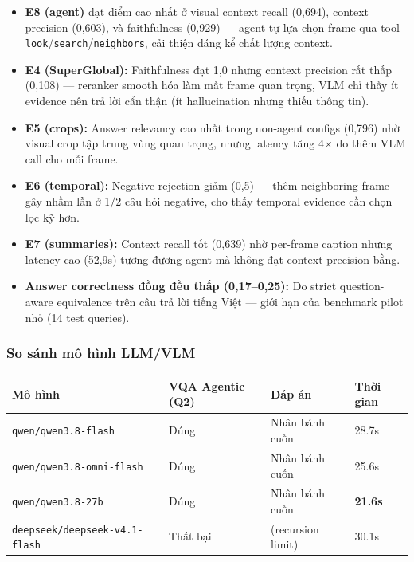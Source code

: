 \documentclass[12pt,a4paper,onecolumn]{article}
\begin{document}
\begin{itemize}
  \item \textbf{E8 (agent)} đạt điểm cao nhất ở visual context recall (0,694), context precision (0,603), và faithfulness (0,929) — agent tự lựa chọn frame qua tool \texttt{look}/\texttt{search}/\texttt{neighbors}, cải thiện đáng kể chất lượng context.
  \item \textbf{E4 (SuperGlobal):} Faithfulness đạt 1,0 nhưng context precision rất thấp (0,108) — reranker smooth hóa làm mất frame quan trọng, VLM chỉ thấy ít evidence nên trả lời cẩn thận (ít hallucination nhưng thiếu thông tin).
  \item \textbf{E5 (crops):} Answer relevancy cao nhất trong non-agent configs (0,796) nhờ visual crop tập trung vùng quan trọng, nhưng latency tăng 4× do thêm VLM call cho mỗi frame.
  \item \textbf{E6 (temporal):} Negative rejection giảm (0,5) — thêm neighboring frame gây nhầm lẫn ở 1/2 câu hỏi negative, cho thấy temporal evidence cần chọn lọc kỹ hơn.
  \item \textbf{E7 (summaries):} Context recall tốt (0,639) nhờ per-frame caption nhưng latency cao (52,9s) tương đương agent mà không đạt context precision bằng.
  \item \textbf{Answer correctness đồng đều thấp (0,17–0,25):} Do strict question-aware equivalence trên câu trả lời tiếng Việt — giới hạn của benchmark pilot nhỏ (14 test queries).
\end{itemize}


\subsubsection{So sánh mô hình LLM/VLM}

\begin{center}
\begin{tabular}{l l l l}
\toprule
Mô hình & VQA Agentic (Q2) & Đáp án & Thời gian \\
\midrule
\texttt{qwen/qwen3.8-flash} & Đúng & Nhân bánh cuốn & 28.7s \\
\texttt{qwen/qwen3.8-omni-flash} & Đúng & Nhân bánh cuốn & 25.6s \\
\texttt{qwen/qwen3.8-27b} & Đúng & Nhân bánh cuốn & \textbf{21.6s} \\
\texttt{deepseek/deepseek-v4.1-flash} & Thất bại & (recursion limit) & 30.1s \\
\bottomrule
\end{tabular}
\end{center}
\end{document}

